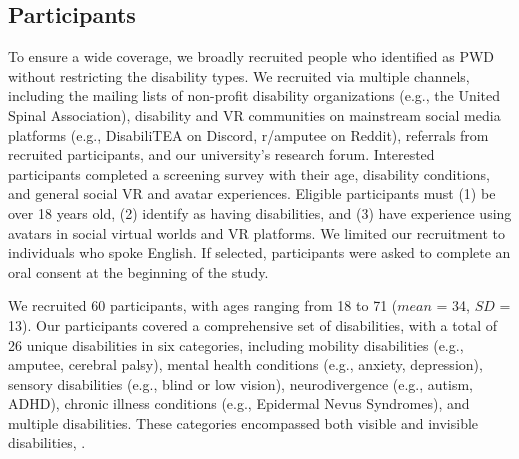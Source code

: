 
\subsection{Participants}
 To ensure a wide coverage, %
we broadly recruited people who identified as PWD without restricting the disability types. We recruited via multiple channels, including the mailing lists of non-profit disability organizations (e.g., the United Spinal Association), disability and VR communities on mainstream social media platforms (e.g., DisabiliTEA on Discord, r/amputee on Reddit), referrals from recruited participants, and our university’s research forum. Interested participants completed a screening survey with their age, disability conditions, and general social VR and avatar experiences. Eligible participants must (1) be over 18 years old, (2) identify as having disabilities, and (3) have experience using avatars in social virtual worlds and VR platforms. We limited our recruitment to individuals who spoke English. If selected, participants were asked to complete an oral consent at the beginning of the study.

We recruited 60 participants, with ages ranging from 18 to 71 ($mean$ = 34, $SD$ = 13). Our participants covered a comprehensive set of disabilities, with a total of 26 unique disabilities in six categories, including mobility disabilities (e.g., amputee, cerebral palsy), mental health conditions (e.g., anxiety, depression), sensory disabilities (e.g., blind or low vision), neurodivergence (e.g., autism, ADHD), chronic illness conditions (e.g., Epidermal Nevus Syndromes), and multiple disabilities. %
These categories encompassed both visible and invisible disabilities, .  

